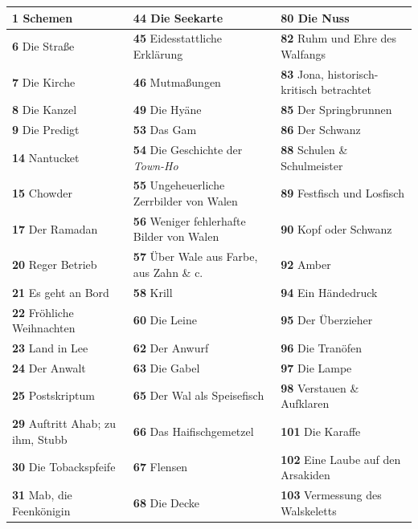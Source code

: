 \documentclass[a5paper,9pt,twoside=false]{extbook}
\begin{document}
\noindent
{\renewcommand{\arraystretch}{1.6} %
\begin{tabularx}{\textwidth}{X|X|X}
  \textbf{1} Schemen & \textbf{44} Die Seekarte & \textbf{80} Die Nuss\\ \hline 
  \textbf{6} Die Straße & \textbf{45} Eidesstattliche Erklärung & \textbf{82} Ruhm und Ehre des Walfangs \\ \hline 
    \textbf{7} Die Kirche & \textbf{46} Mutmaßungen & \textbf{83} Jona, historisch-kritisch betrachtet \\ \hline 
    \textbf{8} Die Kanzel & \textbf{49} Die Hyäne & \textbf{85} Der Springbrunnen \\ \hline 
    \textbf{9} Die Predigt & \textbf{53} Das Gam & \textbf{86} Der Schwanz \\ \hline 
    \textbf{14} Nantucket & \textbf{54} Die Geschichte der \textit{Town-Ho} & \textbf{88} Schulen \& Schulmeister \\ \hline 
    \textbf{15} Chowder & \textbf{55} Ungeheuerliche Zerrbilder von Walen & \textbf{89} Festfisch und Losfisch \\ \hline 
    \textbf{17} Der Ramadan & \textbf{56} Weniger fehlerhafte Bilder von Walen & \textbf{90} Kopf oder Schwanz \\ \hline 
    \textbf{20} Reger Betrieb & \textbf{57} Über Wale aus Farbe, aus Zahn \& c. & \textbf{92} Amber \\ \hline 
    \textbf{21} Es geht an Bord & \textbf{58} Krill & \textbf{94} Ein Händedruck \\ \hline 
    \textbf{22} Fröhliche Weihnachten & \textbf{60} Die Leine & \textbf{95} Der Überzieher \\ \hline 
    \textbf{23} Land in Lee & \textbf{62} Der Anwurf & \textbf{96} Die Tranöfen \\ \hline 
    \textbf{24} Der Anwalt & \textbf{63} Die Gabel & \textbf{97} Die Lampe \\ \hline 
    \textbf{25} Postskriptum & \textbf{65} Der Wal als Speisefisch & \textbf{98} Verstauen \& Aufklaren \\ \hline 
    \textbf{29} Auftritt Ahab; zu ihm, Stubb & \textbf{66} Das Haifischgemetzel & \textbf{101} Die Karaffe \\ \hline 
    \textbf{30} Die Tobackspfeife & \textbf{67} Flensen & \textbf{102} Eine Laube auf den Arsakiden \\ \hline 
    \textbf{31} Mab, die Feenkönigin & \textbf{68} Die Decke & \textbf{103} Vermessung des Walskeletts \\ \hline 

\end{tabularx}}
\end{document}
